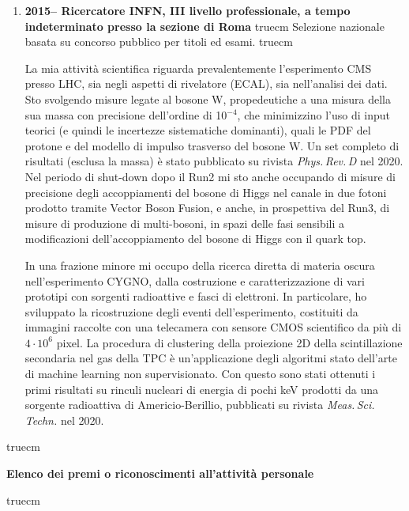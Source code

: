 \documentclass[11pt,twoside,a4paper]{article}
\begin{document}
\begin{enumerate}
Ho svolto l'analisi dei dati per la ricerca di materia oscura nei
canali \textit{monojet}, con un jet e energia trasversa mancante
nell'evento, con i dati del 2016, fino al limite sistematico della
stessa.

 truecm
\item \textbf{2015-- Ricercatore INFN, III livello professionale, a
  tempo indeterminato presso la sezione di Roma}
 truecm
Selezione nazionale basata su concorso pubblico per titoli ed esami.
 truecm

La mia attivit\`a scientifica riguarda prevalentemente l'esperimento
CMS presso LHC, sia negli aspetti di rivelatore (ECAL), sia
nell'analisi dei dati. Sto svolgendo misure legate al bosone W,
propedeutiche a una misura della sua massa con precisione dell'ordine
di 10$^{-4}$, che minimizzino l'uso di input teorici (e quindi le
incertezze sistematiche dominanti), quali le PDF del protone e del
modello di impulso trasverso del bosone W. Un set completo di
risultati (esclusa la massa) \`e stato pubblicato su rivista \textit{Phys.\,Rev.\,D} nel
2020. Nel periodo di shut-down dopo il Run2 mi sto anche occupando di
misure di precisione degli accoppiamenti del bosone di Higgs nel
canale in due fotoni prodotto tramite Vector Boson Fusion, e anche, in
prospettiva del Run3, di misure di produzione di multi-bosoni, in
spazi delle fasi sensibili a modificazioni dell'accoppiamento del
bosone di Higgs con il quark top.

In una frazione minore mi occupo della ricerca diretta di materia
oscura nell'esperimento CYGNO, dalla costruzione e caratterizzazione
di vari prototipi con sorgenti radioattive e fasci di elettroni. In
particolare, ho sviluppato la ricostruzione degli eventi
dell'esperimento, costituiti da immagini raccolte con una telecamera
con sensore CMOS scientifico da pi\`u di $4\cdot10^6$ pixel.  La
procedura di clustering della proiezione 2D della scintillazione
secondaria nel gas della TPC \`e un'applicazione degli algoritmi stato
dell'arte di machine learning non supervisionato. Con questo sono
stati ottenuti i primi risultati su rinculi nucleari di energia di
pochi keV prodotti da una sorgente radioattiva di Americio-Berillio,
pubblicati su rivista \textit{Meas.\,Sci.\,Techn.} nel 2020.

\end{enumerate}


 truecm
\begin{center}
\textbf{Elenco dei premi o riconoscimenti all’attivit\`a personale}
\end{center}
 truecm
\end{document}
